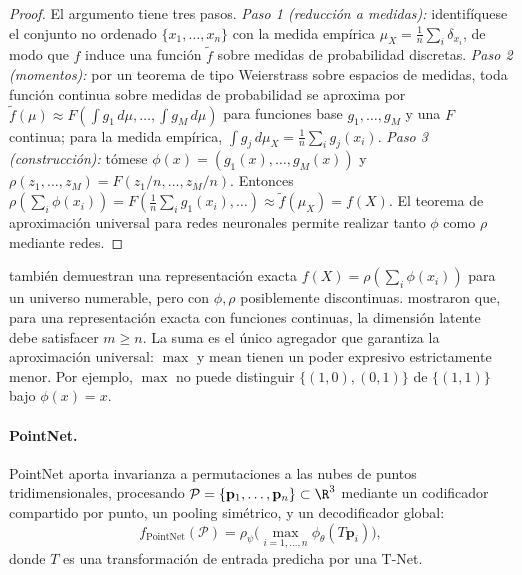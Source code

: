 \begin{proof}
El argumento tiene tres pasos. \emph{Paso 1 (reducci\'on a medidas):}
identif\'iquese el conjunto no ordenado $\{x_1, \dots, x_n\}$ con la medida
emp\'irica $\mu_X = \tfrac{1}{n}\sum_i \delta_{x_i}$, de modo que $f$ induce una
funci\'on $\tilde f$ sobre medidas de probabilidad discretas. \emph{Paso 2
(momentos):} por un teorema de tipo Weierstrass sobre espacios de medidas, toda
funci\'on continua sobre medidas de probabilidad se aproxima por $\tilde f(\mu)
\approx F(\int g_1\, d\mu, \dots, \int g_M\, d\mu)$ para funciones base $g_1,
\dots, g_M$ y una $F$ continua; para la medida emp\'irica, $\int g_j\, d\mu_X =
\tfrac{1}{n}\sum_i g_j(x_i)$. \emph{Paso 3 (construcci\'on):} t\'omese $\phi(x) =
(g_1(x), \dots, g_M(x))$ y $\rho(z_1, \dots, z_M) = F(z_1/n, \dots, z_M/n)$.
Entonces $\rho(\sum_i \phi(x_i)) = F(\tfrac1n\sum_i g_1(x_i), \dots) \approx
\tilde f(\mu_X) = f(X)$. El teorema de aproximaci\'on universal para redes
neuronales permite realizar tanto $\phi$ como $\rho$ mediante redes.
\end{proof}

\begin{remark}
\label{rem:groups:latent-dim}
\citet{zaheer2017deepsets} tambi\'en demuestran una representaci\'on exacta $f(X)
= \rho(\sum_i \phi(x_i))$ para un universo numerable, pero con $\phi, \rho$
posiblemente discontinuas. \citet{wagstaff2019limitations} mostraron que, para
una representaci\'on exacta con funciones continuas, la dimensi\'on latente debe
satisfacer $m \geq n$. La suma es el \'unico agregador que garantiza la
aproximaci\'on universal: $\max$ y $\text{mean}$ tienen un poder expresivo
estrictamente menor. Por ejemplo, $\max$ no puede distinguir $\{(1,0),(0,1)\}$ de
$\{(1,1)\}$ bajo $\phi(x) = x$.
\end{remark}

\paragraph{PointNet.}
PointNet \citep{qi2017pointnet} aporta invarianza a permutaciones a las nubes de
puntos tridimensionales, procesando $\mathcal{P} = \{\mathbf{p}_1, \dots,
\mathbf{p}_n\} \subset \R^3$ mediante un codificador compartido por punto, un
pooling sim\'etrico, y un decodificador global:
\begin{equation}
  f_{\text{PointNet}}(\mathcal{P})
  = \rho_\psi\Big(\max_{i=1,\dots,n} \phi_\theta(T \mathbf{p}_i)\Big),
  \label{eq:groups:pointnet}
\end{equation}
donde $T$ es una transformaci\'on de entrada predicha por una T-Net.

